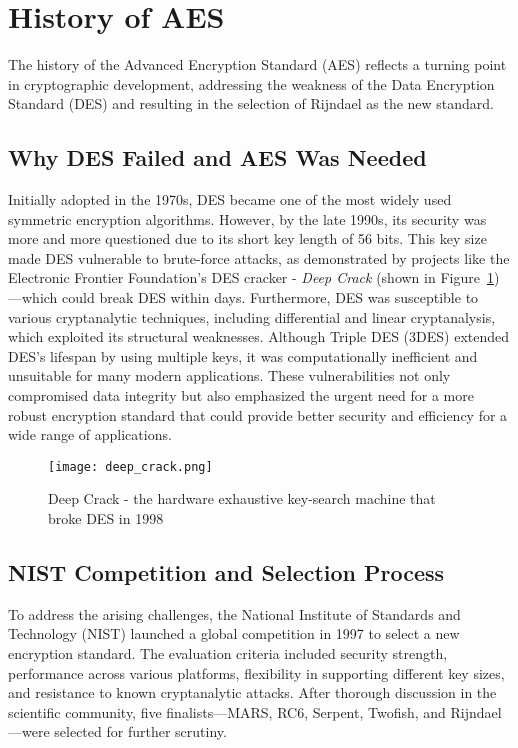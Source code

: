 \section{History of AES}

The history of the Advanced Encryption Standard (AES) reflects a turning point in cryptographic development, 
addressing the weakness of the Data Encryption Standard (DES) and resulting in the selection of Rijndael as the new standard.  

\subsection{Why DES Failed and AES Was Needed}

Initially adopted in the 1970s, DES became one of the most widely used symmetric encryption algorithms. However, by the late 1990s, 
its security was more and more questioned due to its short key length of 56 bits. This key size made DES vulnerable to brute-force attacks, 
as demonstrated by projects like the Electronic Frontier Foundation's DES cracker - \textit{Deep Crack} (shown in Figure~\ref{fig:deep-crack})—which could break DES within days. 
Furthermore, DES was susceptible to various cryptanalytic techniques, including differential and linear cryptanalysis, which exploited its structural weaknesses. 
Although Triple DES (3DES) extended DES's lifespan by using multiple keys, it was computationally inefficient and unsuitable for many modern applications.  
These vulnerabilities not only compromised data integrity but also emphasized the urgent need for a more robust encryption standard that could provide 
better security and efficiency for a wide range of applications. 

\begin{figure}[h] %
    \centering
    \texttt{[image: deep\_crack.png]} %
    \caption{
        Deep Crack - the hardware exhaustive key-search machine that broke DES in 1998~\cite{Paar2024}
    }
    \label{fig:deep-crack} %
\end{figure}
 

\subsection{NIST Competition and Selection Process}

To address the arising challenges, the National Institute of Standards and Technology (NIST) launched a global competition in 1997 to select a new encryption standard. 
The evaluation criteria included security strength, performance across various platforms, flexibility in supporting different key sizes, and resistance to known cryptanalytic attacks. 
After thorough discussion in the scientific community, five finalists—MARS, RC6, Serpent, Twofish, and Rijndael—were selected for further scrutiny. \newline 


